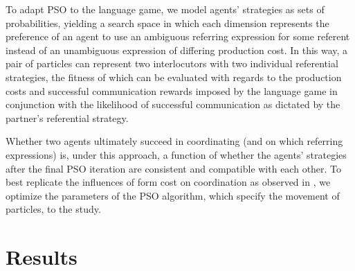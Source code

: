 \documentclass[a4paper,11pt]{article}
\begin{document}
To adapt PSO to the \citeauthor{rohde2012} language game, we model agents' strategies as sets of probabilities, yielding a search space in which each dimension represents the preference of an agent to use an ambiguous referring expression for some referent instead of an unambiguous expression of differing production cost. In this way, a pair of particles can represent two interlocutors with two individual referential strategies, the fitness of which can be evaluated with regards to the production costs and successful communication rewards imposed by the language game in conjunction with the likelihood of successful communication as dictated by the partner's referential strategy. 

Whether two agents ultimately succeed in coordinating (and on which referring expressions) is, under this approach, a function of whether the agents' strategies after the final PSO iteration are consistent and compatible with each other. To best replicate the influences of form cost on coordination as observed in \citeauthor{rohde2012}, we optimize the parameters of the PSO algorithm, which specify the movement of particles, to the study.

\section{Results}





\end{document}
